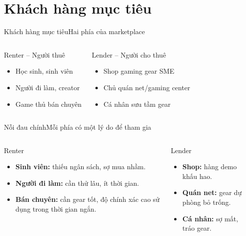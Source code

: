 \section{Khách hàng mục tiêu}

\begin{frame}{Khách hàng mục tiêu}{Hai phía của marketplace}
  \begin{columns}[T,onlytextwidth]
      \begin{block}{Renter -- Người thuê}
        \begin{itemize}\small
          \item Học sinh, sinh viên
          \item Người đi làm, creator
          \item Game thủ bán chuyên
        \end{itemize}
      \end{block}
      \begin{exampleblock}{Lender -- Người cho thuê}
        \begin{itemize}\small
          \item Shop gaming gear SME
          \item Chủ quán net/gaming center
          \item Cá nhân sưu tầm gear
        \end{itemize}
      \end{exampleblock}
  \end{columns}
  \vfill
\end{frame}

\begin{frame}{Nỗi đau chính}{Mỗi phía có một lý do để tham gia}
  \begin{columns}[T,onlytextwidth]
      \begin{block}{Renter}
        \begin{itemize}\small
          \item \textbf{Sinh viên:} thiếu ngân sách, sợ mua nhầm.
          \item \textbf{Người đi làm:} cần thử lâu, ít thời gian.
          \item \textbf{Bán chuyên:} cần gear tốt, độ chính xác cao sử dụng trong thời gian ngắn.
        \end{itemize}
      \end{block}
      \begin{exampleblock}{Lender}
        \begin{itemize}\small
          \item \textbf{Shop:} hàng demo khấu hao.
          \item \textbf{Quán net:} gear dự phòng bỏ trống.
          \item \textbf{Cá nhân:} sợ mất, tráo gear.
        \end{itemize}
      \end{exampleblock}
  \end{columns}
  \vfill
\end{frame}

